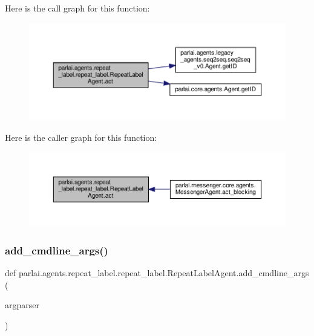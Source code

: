 Here is the call graph for this function\+:
\nopagebreak
\begin{figure}[H]
\begin{center}
\leavevmode
\includegraphics[width=350pt]{classparlai_1_1agents_1_1repeat__label_1_1repeat__label_1_1RepeatLabelAgent_adf5c764bc7ad29787ec7c82646450fed_cgraph}
\end{center}
\end{figure}
Here is the caller graph for this function\+:
\nopagebreak
\begin{figure}[H]
\begin{center}
\leavevmode
\includegraphics[width=350pt]{classparlai_1_1agents_1_1repeat__label_1_1repeat__label_1_1RepeatLabelAgent_adf5c764bc7ad29787ec7c82646450fed_icgraph}
\end{center}
\end{figure}
\mbox{\label{classparlai_1_1agents_1_1repeat__label_1_1repeat__label_1_1RepeatLabelAgent_a8b226276eb5fee84571f4dc84d967aa3}} 
\subsubsection{\texorpdfstring{add\+\_\+cmdline\+\_\+args()}{add\_cmdline\_args()}}
{\footnotesize\ttfamily def parlai.\+agents.\+repeat\+\_\+label.\+repeat\+\_\+label.\+Repeat\+Label\+Agent.\+add\+\_\+cmdline\+\_\+args (\begin{DoxyParamCaption}\item[{}]{argparser }\end{DoxyParamCaption})\hspace{0.3cm}{\ttfamily [static]}}



